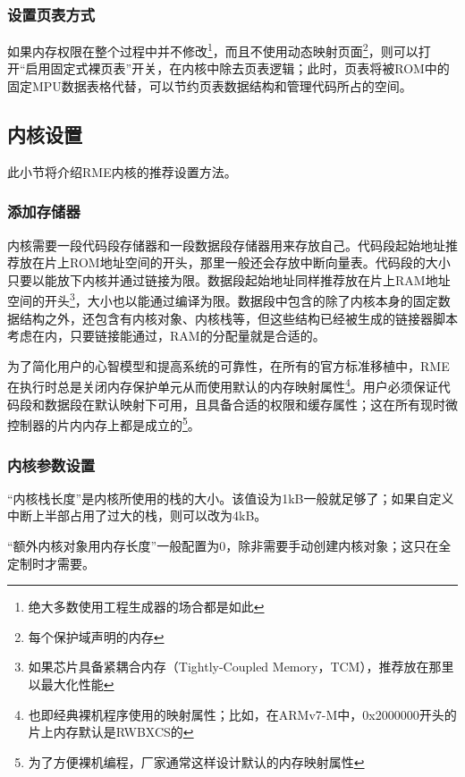 \subsubsection{设置页表方式}\label{subsubsec:6-5-1-6}

如果内存权限在整个过程中并不修改\footnote{绝大多数使用工程生成器的场合都是如此}，而且不使用动态映射页面\footnote{每个保护域声明的内存}，则可以打开``启用固定式裸页表''开关，在内核中除去页表逻辑；此时，页表将被ROM中的固定MPU数据表格代替，可以节约页表数据结构和管理代码所占的空间。

\subsection{内核设置}\label{subsec:6-5-2}

此小节将介绍RME内核的推荐设置方法。

\subsubsection{添加存储器}\label{subsubsec:6-5-2-1}

内核需要一段代码段存储器和一段数据段存储器用来存放自己。代码段起始地址推荐放在片上ROM地址空间的开头，那里一般还会存放中断向量表。代码段的大小只要以能放下内核并通过链接为限。数据段起始地址同样推荐放在片上RAM地址空间的开头\footnote{如果芯片具备紧耦合内存（Tightly-Coupled
  Memory，TCM），推荐放在那里以最大化性能}，大小也以能通过编译为限。数据段中包含的除了内核本身的固定数据结构之外，还包含有内核对象、内核栈等，但这些结构已经被生成的链接器脚本考虑在内，只要链接能通过，RAM的分配量就是合适的。

为了简化用户的心智模型和提高系统的可靠性，在所有的官方标准移植中，RME在执行时总是关闭内存保护单元从而使用默认的内存映射属性\footnote{也即经典裸机程序使用的映射属性；比如，在ARMv7-M中，0x2000000开头的片上内存默认是RWBXCS的}。用户必须保证代码段和数据段在默认映射下可用，且具备合适的权限和缓存属性；这在所有现时微控制器的片内内存上都是成立的\footnote{为了方便裸机编程，厂家通常这样设计默认的内存映射属性}。

\subsubsection{内核参数设置}\label{subsubsec:6-5-2-2}

``内核栈长度''是内核所使用的栈的大小。该值设为1kB一般就足够了；如果自定义中断上半部占用了过大的栈，则可以改为4kB。

``额外内核对象用内存长度''一般配置为0，除非需要手动创建内核对象；这只在全定制时才需要。

